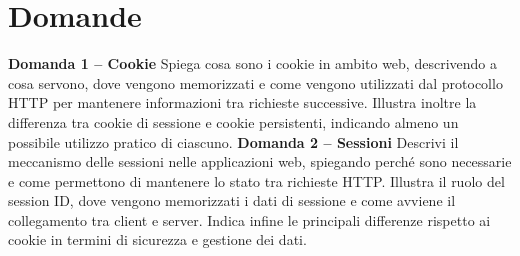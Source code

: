 \documentclass[a4paper,12pt]{article}
\begin{document}
\section*{Domande}

\textbf{Domanda 1 – Cookie}
Spiega cosa sono i cookie in ambito web, descrivendo a cosa servono, dove vengono memorizzati e come vengono utilizzati dal protocollo HTTP per mantenere informazioni tra richieste successive. Illustra inoltre la differenza tra cookie di sessione e cookie persistenti, indicando almeno un possibile utilizzo pratico di ciascuno.
\textbf{Domanda 2 – Sessioni}
Descrivi il meccanismo delle sessioni nelle applicazioni web, spiegando perché sono necessarie e come permettono di mantenere lo stato tra richieste HTTP. Illustra il ruolo del session ID, dove vengono memorizzati i dati di sessione e come avviene il collegamento tra client e server. Indica infine le principali differenze rispetto ai cookie in termini di sicurezza e gestione dei dati.
\end{document}
